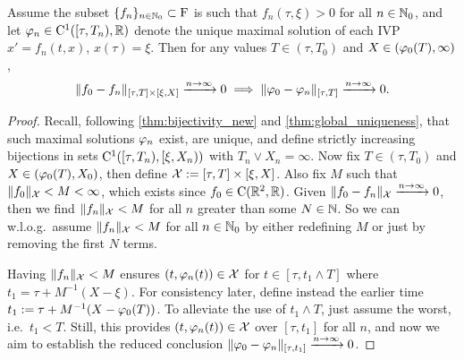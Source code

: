 \begin{theorem}\label{thm:continuity_solution_map}
    Assume the subset $\{f_n\}_{n\in\mathbb{N}_0}\subset\mathrm{F}$ is such that $f_n(\tau,\xi)>0$ for all $n\in\mathbb{N}_0$, and let $\varphi_n\in\mathrm{C}^1([\tau,T_n),\mathbb{R})$ denote the unique maximal solution of each IVP $x'=f_n(t,x)$, $x(\tau)=\xi$. Then for any values $T\in(\tau,T_0)$ and $X\in(\varphi_0(T),\infty)$,
    \begin{equation}\label{eq:continuity_statement}
        \Vert f_0 - f_n \Vert_{[\tau,T]\times[\xi,X]} \xrightarrow{n\to\infty}0 \implies \Vert \varphi_0 - \varphi_n\Vert_{[\tau,T]} \xrightarrow{n\to\infty}0.
    \end{equation}
\end{theorem}
\begin{proof}
    Recall, following \autoref{thm:bijectivity_new} and \autoref{thm:global_uniqueness}, that such maximal solutions $\varphi_n$ exist, are unique, and define strictly increasing bijections in sets $\mathrm{C}^1([\tau,T_n),[\xi,X_n))$ with $T_n\vee X_n=\infty$. Now fix $T\in(\tau,T_0)$ and $X\in(\varphi_0(T),X_0)$, then define $\mathcal{X}:=[\tau,T]\times[\xi,X]$. Also fix $M$ such that $\Vert f_0\Vert_{\mathcal{X}}<M<\infty$, which exists since $f_0\in\mathrm{C}(\mathbb{R}^2,\mathbb{R})$. Given $\Vert f_0 - f_n \Vert_{\mathcal{X}} \xrightarrow{n\to\infty}0$, then we find $\Vert f_n\Vert_{\mathcal{X}}<M$ for all $n$ greater than some $N\in\mathbb{N}$. So we can w.l.o.g.~assume $\Vert f_n\Vert_{\mathcal{X}}< M$ for all $n\in\mathbb{N}_0$ by either redefining $M$ or just by removing the first $N$ terms.

    Having $\Vert f_n\Vert_{\mathcal{X}}< M$ ensures $(t,\varphi_n(t))\in\mathcal{X}$ for $t\in[\tau,t_1\wedge T]$ where $t_1=\tau+M^{-1}(X-\xi)$. For consistency later, define instead the earlier time $t_1:=\tau+M^{-1}(X-\varphi_0(T))$. To alleviate the use of $t_1\wedge T$, just assume the worst, i.e.~$t_1<T$. Still, this provides $(t,\varphi_n(t))\in\mathcal{X}$ over $[\tau,t_1]$ for all $n$, and now we aim to establish the reduced conclusion $\Vert \varphi_0 - \varphi_n\Vert_{[\tau,t_1]} \xrightarrow{n\to\infty}0$.


\end{proof}
